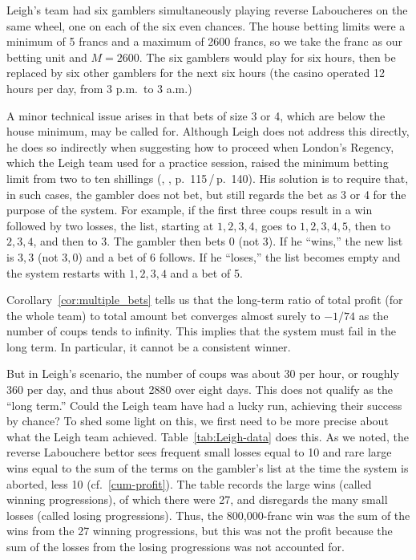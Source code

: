 \documentclass{article}
\theoremstyle{definition}
\theoremstyle{remark}
\begin{document}
Leigh’s team had six gamblers simultaneously playing reverse Laboucheres on the same wheel, one on each of the six even chances.  The house betting limits were a minimum of 5 francs and a maximum of 2600 francs, so we take the franc as our betting unit and $M=2600$.  The six gamblers would play for six hours, then be replaced by six other gamblers for the next six hours (the casino operated 12 hours per day, from 3 p.m.\ to 3 a.m.)

A minor technical issue arises in that bets of size 3 or 4, which are below the house minimum, may be called for.  Although Leigh does not address this directly, he does so indirectly when suggesting how to proceed when London's Regency, which the Leigh team used for a practice session, raised the minimum betting limit from two to ten shillings (\citeauthor{L76}, \citeyear{L76}, p.~115\,/\,p.~140).  His solution is to require that, in such cases, the gambler does not bet, but still regards the bet as 3 or 4 for the purpose of the system.  For example, if the first three coups result in a win followed by two losses, the list, starting at $1,2,3,4$, goes to $1,2,3,4,5$, then to $2,3,4$, and then to 3.  The gambler then bets 0 (not 3).  If he ``wins,'' the new list is $3,3$ (not $3,0$) and a bet of 6 follows.  If he ``loses,'' the list becomes empty and the system restarts with $1,2,3,4$ and a bet of 5.

Corollary~\ref{cor:multiple_bets} tells us that the long-term ratio of total profit (for the whole team) to total amount bet converges almost surely to $-1/74$ as the number of coups tends to infinity.  This implies that the system must fail in the long term.  In particular, it cannot be a consistent winner.

But in Leigh's scenario, the number of coups was about 30 per hour, or roughly 360 per day, and thus about 2880 over eight days.  This does not qualify as the ``long term.''  Could the Leigh team have had a lucky run, achieving their success by chance?  To shed some light on this, we first need to be more precise about what the Leigh team achieved.  Table~\ref{tab:Leigh-data} does this.  As we noted, the reverse Labouchere bettor sees frequent small losses equal to 10 and rare large wins equal to the sum of the terms on the gambler's list at the time the system is aborted, less 10 (cf.~\eqref{cum-profit}).  The table records the large wins (called winning progressions), of which there were 27, and disregards the many small losses (called losing progressions).  Thus, the 800,000-franc win was the sum of the wins from the 27 winning progressions, but this was not the profit because the sum of the losses from the losing progressions was not accounted for.  
\end{document}
